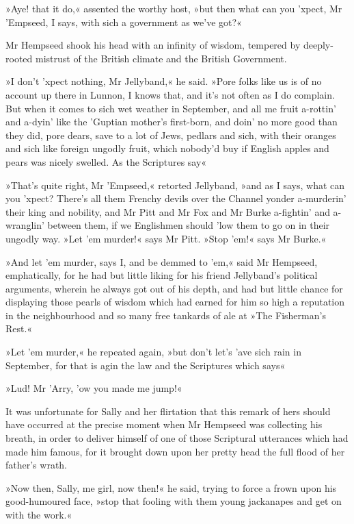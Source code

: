 »Aye! that it do,« assented the worthy host, »but then what can you 'xpect, Mr 'Empseed, I says, with sich a government as we've got?«

Mr Hempseed shook his head with an infinity of wisdom, tempered by deeply-rooted mistrust of the British climate and the British Government.

»I don't 'xpect nothing, Mr Jellyband,« he said. »Pore folks like us is of no account up there in Lunnon, I knows that, and it's not often as I do complain. But when it comes to sich wet weather in September, and all me fruit a-rottin' and a-dyin' like the 'Guptian mother's first-born, and doin' no more good than they did, pore dears, save to a lot of Jews, pedlars and sich, with their oranges and sich like foreign ungodly fruit, which nobody'd buy if English apples and pears was nicely swelled. As the Scriptures say\longdash«

»That's quite right, Mr 'Empseed,« retorted Jellyband, »and as I says, what can you 'xpect? There's all them Frenchy devils over the Channel yonder a-murderin' their king and nobility, and Mr Pitt and Mr Fox and Mr Burke a-fightin' and a-wranglin' between them, if we Englishmen should 'low them to go on in their ungodly way. »Let 'em murder!« says Mr Pitt. »Stop 'em!« says Mr Burke.«

»And let 'em murder, says I, and be demmed to 'em,« said Mr Hempseed, emphatically, for he had but little liking for his friend Jellyband's political arguments, wherein he always got out of his depth, and had but little chance for displaying those pearls of wisdom which had earned for him so high a reputation in the neighbourhood and so many free tankards of ale at »The Fisherman's Rest.«

»Let 'em murder,« he repeated again, »but don't let's 'ave sich rain in September, for that is agin the law and the Scriptures which says\longdash«

»Lud! Mr 'Arry, 'ow you made me jump!«

It was unfortunate for Sally and her flirtation that this remark of hers should have occurred at the precise moment when Mr Hempseed was collecting his breath, in order to deliver himself of one of those Scriptural utterances which had made him famous, for it brought down upon her pretty head the full flood of her father's wrath.

»Now then, Sally, me girl, now then!« he said, trying to force a frown upon his good-humoured face, »stop that fooling with them young jackanapes and get on with the work.«

